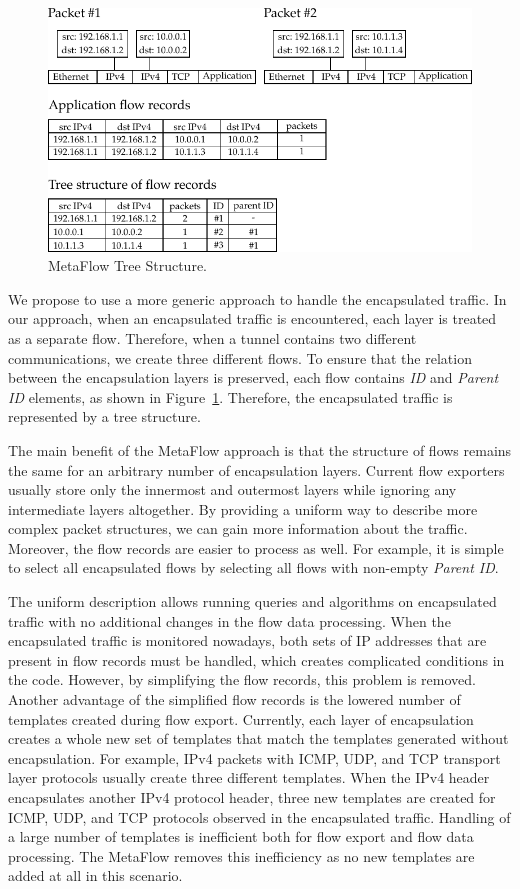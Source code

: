 \begin{figure}[!tb]
    \centering 
    \includegraphics{figures/c07/metaflow}
    \caption{MetaFlow Tree Structure.}
    \label{fig:metaflow}
\end{figure}

We propose to use a more generic approach to handle the encapsulated traffic. In our approach, when an encapsulated traffic is encountered, each layer is treated as a separate flow. Therefore, when a tunnel contains two different communications, we create three different flows. To ensure that the relation between the encapsulation layers is preserved, each flow contains \emph{ID} and \emph{Parent ID} elements, as shown in Figure~\ref{fig:metaflow}. Therefore, the encapsulated traffic is represented by a tree structure.

The main benefit of the MetaFlow approach is that the structure of flows remains the same for an arbitrary number of encapsulation layers. Current flow exporters usually store only the innermost and outermost layers while ignoring any intermediate layers altogether. By providing a uniform way to describe more complex packet structures, we can gain more information about the traffic. Moreover, the flow records are easier to process as well. For example, it is simple to select all encapsulated flows by selecting all flows with non-empty \emph{Parent ID}.

The uniform description allows running queries and algorithms on encapsulated traffic with no additional changes in the flow data processing. When the encapsulated traffic is monitored nowadays, both sets of IP addresses that are present in flow records must be handled, which creates complicated conditions in the code. However, by simplifying the flow records, this problem is removed. Another advantage of the simplified flow records is the lowered number of templates created during flow export. Currently, each layer of encapsulation creates a whole new set of templates that match the templates generated without encapsulation. For example, IPv4 packets with ICMP, UDP, and TCP transport layer protocols usually create three different templates. When the IPv4 header encapsulates another IPv4 protocol header, three new templates are created for ICMP, UDP, and TCP protocols observed in the encapsulated traffic. Handling of a large number of templates is inefficient both for flow export and flow data processing. The MetaFlow removes this inefficiency as no new templates are added at all in this scenario.

